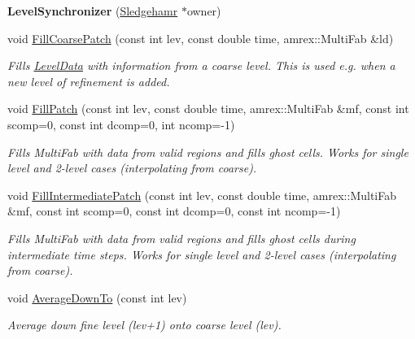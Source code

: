 \begin{DoxyCompactItemize}
\item 
\mbox{\label{classsledgehamr_1_1LevelSynchronizer_a28eb74d8fe0c22d97483543350c6eb2a}} 
{\bfseries Level\+Synchronizer} (\mbox{\hyperlink{classsledgehamr_1_1Sledgehamr}{Sledgehamr}} $\ast$owner)
\item 
void \mbox{\hyperlink{classsledgehamr_1_1LevelSynchronizer_ab7b774c45a02b121bb6d6cb796875805}{Fill\+Coarse\+Patch}} (const int lev, const double time, amrex\+::\+Multi\+Fab \&ld)
\begin{DoxyCompactList}\small\item\em Fills \mbox{\hyperlink{classsledgehamr_1_1LevelData}{Level\+Data}} with information from a coarse level. This is used e.\+g. when a new level of refinement is added. \end{DoxyCompactList}\item 
void \mbox{\hyperlink{classsledgehamr_1_1LevelSynchronizer_a54ddd443981e5849456ac1c945aebede}{Fill\+Patch}} (const int lev, const double time, amrex\+::\+Multi\+Fab \&mf, const int scomp=0, const int dcomp=0, int ncomp=-\/1)
\begin{DoxyCompactList}\small\item\em Fills Multi\+Fab with data from valid regions and fills ghost cells. Works for single level and 2-\/level cases (interpolating from coarse). \end{DoxyCompactList}\item 
void \mbox{\hyperlink{classsledgehamr_1_1LevelSynchronizer_a8fc4c9b24c2f1c6107e456e76a1cf28d}{Fill\+Intermediate\+Patch}} (const int lev, const double time, amrex\+::\+Multi\+Fab \&mf, const int scomp=0, const int dcomp=0, const int ncomp=-\/1)
\begin{DoxyCompactList}\small\item\em Fills Multi\+Fab with data from valid regions and fills ghost cells during intermediate time steps. Works for single level and 2-\/level cases (interpolating from coarse). \end{DoxyCompactList}\item 
void \mbox{\hyperlink{classsledgehamr_1_1LevelSynchronizer_a8242eca3f0b55a87c5ea68b6d7ac6fdb}{Average\+Down\+To}} (const int lev)
\begin{DoxyCompactList}\small\item\em Average down fine level (lev+1) onto coarse level (lev). \end{DoxyCompactList}\item 

\end{DoxyCompactItemize}
